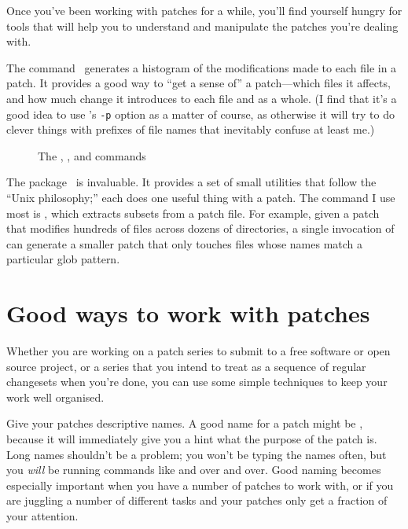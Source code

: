 Once you've been working with patches for a while, you'll find
yourself hungry for tools that will help you to understand and
manipulate the patches you're dealing with.

The  command~\cite{web:diffstat} generates a
histogram of the modifications made to each file in a patch.  It
provides a good way to ``get a sense of'' a patch---which files it
affects, and how much change it introduces to each file and as a
whole.  (I find that it's a good idea to use 's
\texttt{-p} option as a matter of course, as otherwise it will try to
do clever things with prefixes of file names that inevitably confuse
at least me.)

\begin{figure}[ht]
  \caption{The , , and  commands}
  \label{ex:mq:tools}
\end{figure}

The  package~\cite{web:patchutils} is invaluable.
It provides a set of small utilities that follow the ``Unix
philosophy;'' each does one useful thing with a patch.  The
 command I use most is , which
extracts subsets from a patch file.  For example, given a patch that
modifies hundreds of files across dozens of directories, a single
invocation of  can generate a smaller patch that
only touches files whose names match a particular glob pattern.

\section{Good ways to work with patches}

Whether you are working on a patch series to submit to a free software
or open source project, or a series that you intend to treat as a
sequence of regular changesets when you're done, you can use some
simple techniques to keep your work well organised.

Give your patches descriptive names.  A good name for a patch might be
, because it will immediately give
you a hint what the purpose of the patch is.  Long names shouldn't be
a problem; you won't be typing the names often, but you \emph{will} be
running commands like  and  over and over.
Good naming becomes especially important when you have a number of
patches to work with, or if you are juggling a number of different
tasks and your patches only get a fraction of your attention.

